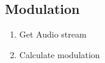 \subsection{Modulation}

\begin{enumerate}
  \item Get Audio stream
  \item Calculate modulation
\end{enumerate}